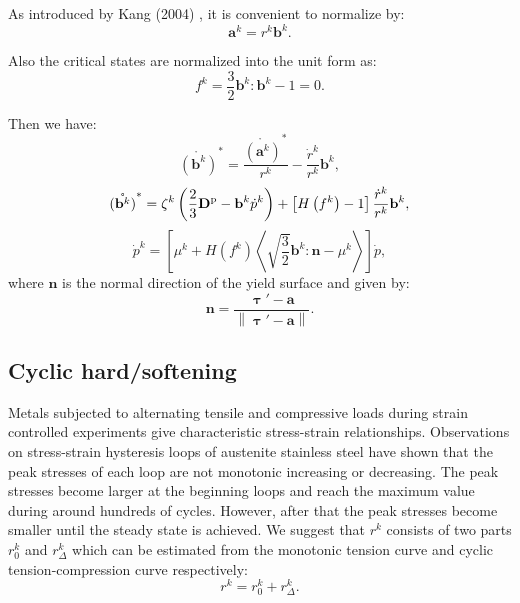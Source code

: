 As introduced by Kang (2004) \cite{kang2004visco}, it is convenient to normalize by:
\begin{equation}
\label{Equ_5:ak1}
{{\mathbf{a}}^k} = {r^k}{{\mathbf{b}}^k}.
\end{equation}

Also the critical states are normalized into the unit form as:
\begin{equation}
{f^k} = \frac{3}{2}{{\mathbf{b}}^k}:{{\mathbf{b}}^k} - 1 = 0.
\end{equation}

Then we have:
\begin{equation}
\mathring{\left({\mathbf{b}}^{k}\right)}^* = \frac{\mathring{\left({\mathbf{a}}^{k}\right)}^*}{{{r^k}}} - \frac{{{{\dot r}^k}}}{{{r^k}}}{{\mathbf{b}}^k},
\end{equation}
\begin{equation}
\mathring{\left({\mathbf{b}}^{k}\right)}^* = {\zeta ^k}\left( {\frac{2}{3}{{\mathbf{D}}^{\rm{p}}} - {{\mathbf{b}}^k}{{\dot p}^k}} \right) + \left[ {H\left( {{f^k}} \right) - 1} \right]\frac{{{{\dot r}^k}}}{{{r^k}}}{{\mathbf{b}}^k},
\end{equation}
\begin{equation}
{\dot p^k} = \left[ {{\mu ^k} + H\left( {{f^k}} \right)\left\langle {\sqrt {\frac{3}{2}} {{\mathbf{b}}^k}:{\mathbf{n}} - {\mu ^k}} \right\rangle } \right]\dot p,
\end{equation}
where ${\mathbf{n}}$ is the normal direction of the yield surface and given by:
\begin{equation}
{\mathbf{n}} = \frac{{{\bm{\uptau}'} - {\mathbf{a}}}}{{\left\| {{\bm{\uptau}}' - {\mathbf{a}}} \right\|}}.
\end{equation}

\subsection{Cyclic hard/softening}
\noindent
Metals subjected to alternating tensile and compressive loads during strain controlled experiments give characteristic stress-strain relationships. Observations on stress-strain hysteresis loops of austenite stainless steel have shown that the peak stresses of each loop are not monotonic increasing or decreasing. The peak stresses become larger at the beginning loops and reach the maximum value during around hundreds of cycles. However, after that the peak stresses become smaller until the steady state is achieved. We suggest that $r^k$ consists of two parts $r_0^k$ and $r_{\Delta}^k$ which can be estimated from the monotonic tension curve and cyclic tension-compression curve respectively:
\begin{equation}
\label{Equ_5:rk1}
{r^k} = r_0^k + r_\Delta ^k.
\end{equation}

